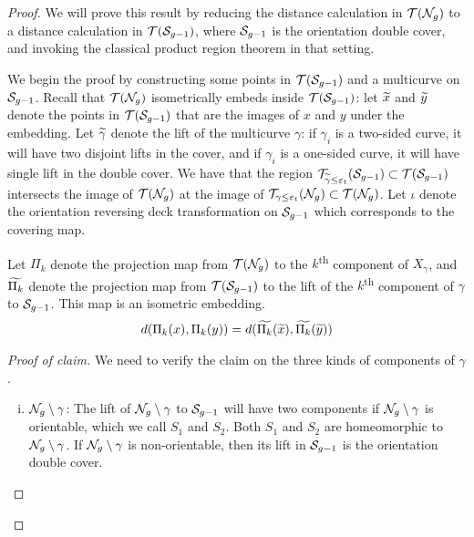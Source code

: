 \documentclass[12pt, reqno]{amsart}
\begin{document}
\begin{proof}
  We will prove this result by reducing the distance calculation in $\mathcal{T}(\mathcal{N}_g)$ to a distance calculation in $\mathcal{T}(\mathcal{S}_{g-1})$, where $\mathcal{S}_{g-1}$ is the orientation double cover, and invoking the classical product region theorem in that setting.

  We begin the proof by constructing some points in $\mathcal{T}(\mathcal{S}_{g-1})$ and a multicurve on $\mathcal{S}_{g-1}$.
  Recall that $\mathcal{T}(\mathcal{N}_g)$ isometrically embeds inside $\mathcal{T}(\mathcal{S}_{g-1})$: let $\widetilde{x}$ and $\widetilde{y}$ denote the points in $\mathcal{T}(\mathcal{S}_{g-1})$ that are the images of $x$ and $y$ under the embedding.
  Let $\widetilde{\gamma}$ denote the lift of the multicurve $\gamma$: if $\gamma_i$ is a two-sided curve, it will have two disjoint lifts in the cover, and if $\gamma_i$ is a one-sided curve, it will have single lift in the double cover.
  We have that the region $\mathcal{T}_{\widetilde{\gamma} \leq \varepsilon_t}(\mathcal{S}_{g-1}) \subset \mathcal{T}(\mathcal{S}_{g-1})$ intersects the image of $\mathcal{T}(\mathcal{N}_g)$ at the image of $\mathcal{T}_{\gamma \leq \varepsilon_t}(\mathcal{N}_g) \subset \mathcal{T}(\mathcal{N}_g)$.
  Let $\iota$ denote the orientation reversing deck transformation on $\mathcal{S}_{g-1}$ which corresponds to the covering map.

  \begin{claim*}
    Let $\Pi_k$ denote the projection map from $\mathcal{T}(\mathcal{N}_g)$ to the $k$\textsuperscript{th} component of $X_\gamma$, and $\widetilde{\Pi_k}$ denote the projection map from $\mathcal{T}(\mathcal{S}_{g-1})$ to the lift of the $k$\textsuperscript{th} component of $\gamma$ to $\mathcal{S}_{g-1}$.
    This map is an isometric embedding.
    \begin{align*}
      d(\Pi_k(x), \Pi_k(y)) = d(\widetilde{\Pi_k}(\widetilde{x}), \widetilde{\Pi_k}(\widetilde{y}))
    \end{align*}
  \end{claim*}

  \begin{proof}[Proof of claim]
  We need to verify the claim on the three kinds of components of $\gamma$.
  \begin{enumerate}[(i)]
  \item $\mathcal{N}_g \setminus \gamma$: The lift of $\mathcal{N}_g \setminus \gamma$ to $\mathcal{S}_{g-1}$ will have two components if $\mathcal{N}_g \setminus \gamma$ is orientable, which we call $S_1$ and $S_2$. Both $S_1$ and $S_2$ are homeomorphic to $\mathcal{N}_g \setminus \gamma$.
    If $\mathcal{N}_g \setminus \gamma$ is non-orientable, then its lift in $\mathcal{S}_{g-1}$ is the orientation double cover.


\end{enumerate}
\end{proof}
\end{proof}
\end{document}
